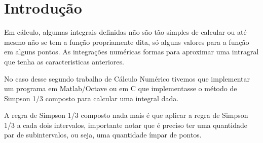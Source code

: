 \chapter*[Introdução]{Introdução}
Em cálculo, algumas integrais definidas não são tão simples de calcular ou até
mesmo não se tem a função propriamente dita, só alguns valores para a função em
alguns pontos. As integrações numéricas formas para aproximar uma intragral que tenha as
caracteristicas anteriores.

No caso desse segundo trabalho de Cálculo Numérico tivemos que implementar um
programa em Matlab/Octave ou em C que implementasse o método de Simpson 1/3
composto para calcular uma integral dada.

A regra de Simpson 1/3 composto nada mais é que aplicar a regra de Simpson 1/3 a
cada dois intervalos, importante notar que é preciso ter uma quantidade par de
subintervalos, ou seja, uma quantidade ímpar de pontos.
